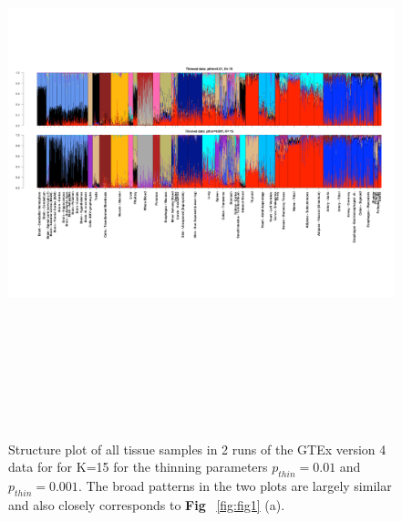  \begin{figure}
 \raggedleft
\includegraphics[height=6.5in, width=9.5in]{../plots/gtex-figures/gtex2.pdf}
    \caption{Structure plot of all tissue samples in 2 runs of the GTEx version 4 data for for K=15 for the thinning parameters $p_{thin}=0.01$ and $p_{thin}=0.001$. The broad patterns in the two plots are largely similar and also closely corresponds to \textbf{Fig} ~\ref{fig:fig1} (a). }
 \label{fig:figS1}
    \end{figure}


